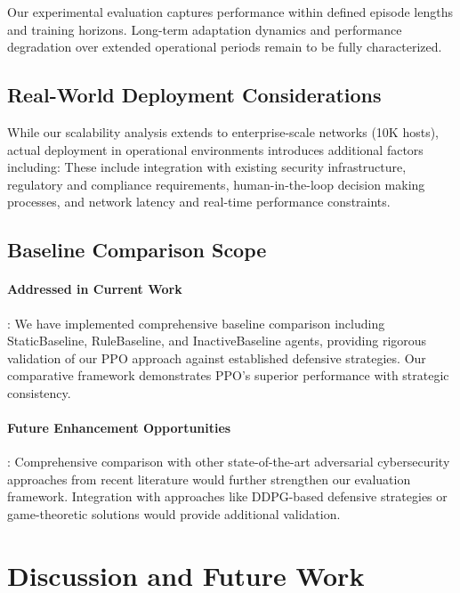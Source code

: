 \documentclass[12pt,oneside]{article}
\begin{document}
Our experimental evaluation captures performance within defined episode lengths and training horizons. Long-term adaptation dynamics and performance degradation over extended operational periods remain to be fully characterized.

\subsection{Real-World Deployment Considerations}

While our scalability analysis extends to enterprise-scale networks (10K hosts), actual deployment in operational environments introduces additional factors including:
These include integration with existing security infrastructure, regulatory and compliance requirements, human-in-the-loop decision making processes, and network latency and real-time performance constraints.

\subsection{Baseline Comparison Scope}

\paragraph{Addressed in Current Work}: We have implemented comprehensive baseline comparison including StaticBaseline, RuleBaseline, and InactiveBaseline agents, providing rigorous validation of our PPO approach against established defensive strategies. Our comparative framework demonstrates PPO's superior performance with strategic consistency.

\paragraph{Future Enhancement Opportunities}: Comprehensive comparison with other state-of-the-art adversarial cybersecurity approaches from recent literature would further strengthen our evaluation framework. Integration with approaches like DDPG-based defensive strategies or game-theoretic solutions would provide additional validation.



\clearpage
\section{Discussion and Future Work}
\end{document}
